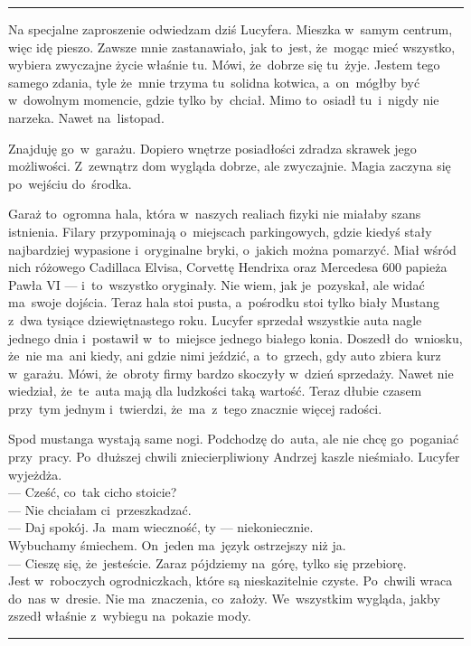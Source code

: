 \documentclass[9pt, a5paper]{memoir}
\begin{document}
\fancybreak{* \quad * \quad *}

Na specjalne zaproszenie odwiedzam dziś Lucyfera. Mieszka w~samym centrum, więc idę pieszo. Zawsze mnie zastanawiało, jak to~jest, że~mogąc mieć wszystko, wybiera zwyczajne życie właśnie tu. Mówi, że~dobrze się tu~żyje. Jestem tego samego zdania, tyle że~mnie trzyma tu~solidna kotwica, a~on~mógłby być w~dowolnym momencie, gdzie tylko by~chciał. Mimo to~osiadł tu~i~nigdy nie narzeka. Nawet na~listopad.

Znajduję go~w~garażu. Dopiero wnętrze posiadłości zdradza skrawek jego możliwości. Z~zewnątrz dom wygląda dobrze, ale zwyczajnie. Magia zaczyna się po~wejściu do~środka.

Garaż to~ogromna hala, która w~naszych realiach fizyki nie miałaby szans istnienia. Filary przypominają o~miejscach parkingowych, gdzie kiedyś stały najbardziej wypasione i~oryginalne bryki, o~jakich można pomarzyć. Miał wśród nich różowego Cadillaca Elvisa, Corvettę Hendrixa oraz Mercedesa 600 papieża Pawła VI --- i~to~wszystko oryginały. Nie wiem, jak je~pozyskał, ale widać ma~swoje dojścia. Teraz hala stoi pusta, a~pośrodku stoi tylko biały Mustang z~dwa tysiące dziewiętnastego roku. Lucyfer sprzedał wszystkie auta nagle jednego dnia i~postawił w~to~miejsce jednego białego konia. Doszedł do~wniosku, że~nie ma~ani kiedy, ani gdzie nimi jeździć, a~to~grzech, gdy auto zbiera kurz w~garażu. Mówi, że~obroty firmy bardzo skoczyły w~dzień sprzedaży. Nawet nie wiedział, że~te~auta mają dla ludzkości taką wartość. Teraz dłubie czasem przy~tym jednym i~twierdzi, że~ma~z~tego znacznie więcej radości.

Spod mustanga wystają same nogi. Podchodzę do~auta, ale nie chcę go~poganiać przy~pracy. Po~dłuższej chwili zniecierpliwiony Andrzej kaszle nieśmiało. Lucyfer wyjeżdża.\\
--- Cześć, co~tak cicho stoicie?\\
--- Nie chciałam ci~przeszkadzać.\\
--- Daj spokój. Ja~mam wieczność, ty --- niekoniecznie.\\
Wybuchamy śmiechem. On~jeden ma~język ostrzejszy niż ja.\\
--- Cieszę się, że~jesteście. Zaraz pójdziemy na~górę, tylko się przebiorę.\\
Jest w~roboczych ogrodniczkach, które są nieskazitelnie czyste. Po~chwili wraca do~nas w~dresie. Nie ma~znaczenia, co~założy. We~wszystkim wygląda, jakby zszedł właśnie z~wybiegu na~pokazie mody.

\fancybreak{* \quad * \quad *}
\end{document}
